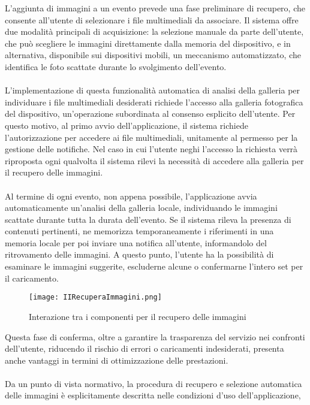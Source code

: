 L’aggiunta di immagini a un evento prevede una fase preliminare di recupero, 
che consente all’utente di selezionare i file multimediali da associare. 
Il sistema offre due modalità principali di acquisizione: 
la selezione manuale da parte dell’utente, 
che può scegliere le immagini direttamente dalla memoria del dispositivo, 
e in alternativa, disponibile sui dispositivi mobili, un meccanismo automatizzato, 
che identifica le foto scattate durante lo svolgimento dell’evento.\\
\\
L’implementazione di questa funzionalità automatica di analisi della galleria 
per individuare i file multimediali desiderati  richiede l’accesso alla galleria fotografica del dispositivo, 
un’operazione subordinata al consenso esplicito dell’utente. 
Per questo motivo, al primo avvio dell’applicazione, 
il sistema richiede l’autorizzazione per accedere ai file multimediali, 
unitamente al permesso per la gestione delle notifiche. 
Nel caso in cui l’utente neghi l’accesso 
la richiesta verrà riproposta ogni qualvolta il sistema rilevi la necessità 
di accedere alla galleria per il recupero delle immagini.\\
\\
Al termine di ogni evento, non appena possibile, 
l'applicazione avvia automaticamente un’analisi della galleria locale, 
individuando le immagini scattate durante tutta la durata dell’evento. 
Se il sistema rileva la presenza di contenuti pertinenti, 
ne memorizza temporaneamente i riferimenti in una memoria locale per poi inviare una notifica all’utente, 
informandolo del ritrovamento delle immagini. 
A questo punto, l’utente ha la possibilità di esaminare le immagini suggerite, 
escluderne alcune o confermarne l’intero set per il caricamento.\\
\begin{figure}[htb]
    \centering
    \texttt{[image: IIRecuperaImmagini.png]}
    \caption{Interazione tra i componenti per il recupero delle immagini}
\end{figure}
\clearpage
Questa fase di conferma, oltre a garantire la trasparenza del servizio nei confronti dell’utente, 
riducendo il rischio di errori o caricamenti indesiderati, 
presenta anche vantaggi in termini di ottimizzazione delle prestazioni. \\
\\
Da un punto di vista normativo, 
la procedura di recupero e selezione automatica delle immagini
è esplicitamente descritta nelle condizioni d’uso dell’applicazione, 
